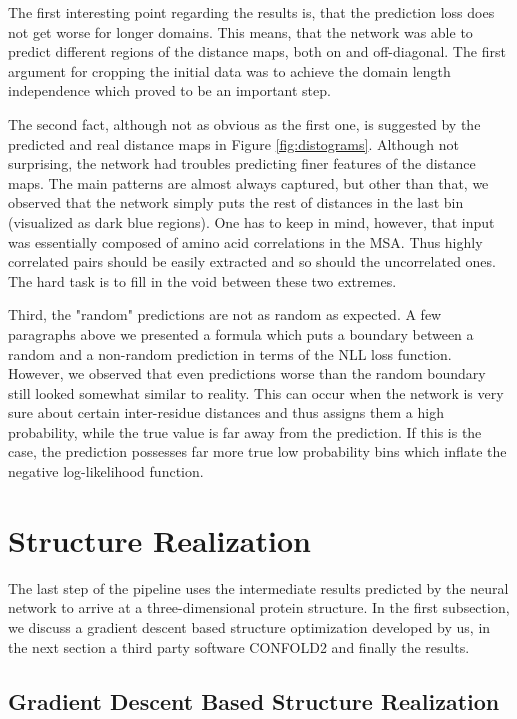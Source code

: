 The first interesting point regarding the results is, that the prediction loss does not get worse for longer domains. This means, that the network was able to predict different regions of the distance maps, both on and off-diagonal. The first argument for cropping the initial data was to achieve the domain length independence which proved to be an important step.

The second fact, although not as obvious as the first one, is suggested by the predicted and real distance maps in Figure \ref{fig:distograms}. Although not surprising, the network had troubles predicting finer features of the distance maps. The main patterns are almost always captured, but other than that, we observed that the network simply puts the rest of distances in the last bin (visualized as dark blue regions). One has to keep in mind, however, that input was essentially composed of amino acid correlations in the MSA. Thus highly correlated pairs should be easily extracted and so should the uncorrelated ones. The hard task is to fill in the void between these two extremes.

Third, the "random" predictions are not as random as expected. A few paragraphs above we presented a formula which puts a boundary between a random and a non-random prediction in terms of the NLL loss function. However, we observed that even predictions worse than the random boundary still looked somewhat similar to reality. This can occur when the network is very sure about certain inter-residue distances and thus assigns them a high probability, while the true value is far away from the prediction. If this is the case, the prediction possesses far more true low probability bins which inflate the negative log-likelihood function.

\section{Structure Realization}

The last step of the pipeline uses the intermediate results predicted by the neural network to arrive at a three-dimensional protein structure. In the first subsection, we discuss a gradient descent based structure optimization developed by us, in the next section a third party software CONFOLD2 and finally the results. 

\subsection{Gradient Descent Based Structure Realization}

